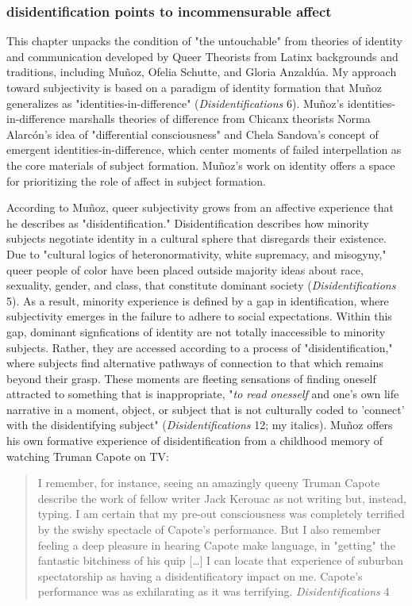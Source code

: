 \documentclass[11pt]{article}
\begin{document}
\subsubsection{disidentification points to incommensurable affect}
\label{sec:org0570c01}
This chapter unpacks the condition of "the untouchable" from theories
of identity and communication developed by Queer Theorists from Latinx
backgrounds and traditions, including Muñoz, Ofelia Schutte, and
Gloria Anzaldúa. My approach toward subjectivity is based on a
paradigm of identity formation that Muñoz generalizes as
"identities-in-difference" (\emph{Disidentifications} 6). Muñoz's
identities-in-difference marshalls theories of difference from Chicanx
theorists Norma Alarcón's idea of "differential consciousness" and
Chela Sandova's concept of emergent identities-in-difference, which
center moments of failed interpellation as the core materials of
subject formation. Muñoz's work on identity offers a space for
prioritizing the role of affect in subject formation.

According to Muñoz, queer subjectivity grows from an affective
experience that he describes as "disidentification." Disidentification
describes how minority subjects negotiate identity in a cultural
sphere that disregards their existence. Due to "cultural logics of
heteronormativity, white supremacy, and misogyny," queer people of
color have been placed outside majority ideas about race, sexuality,
gender, and class, that constitute dominant society
(\emph{Disidentifications} 5). As a result, minority experience is defined
by a gap in identification, where subjectivity emerges in the failure
to adhere to social expectations. Within this gap, dominant
signfications of identity are not totally inaccessible to minority
subjects. Rather, they are accessed according to a process of
"disidentification," where subjects find alternative pathways of
connection to that which remains beyond their grasp. These moments are
fleeting sensations of finding oneself attracted to something that is
inappropriate, "\emph{to read onesself} and one's own life narrative in a
moment, object, or subject that is not culturally coded to 'connect'
with the disidentifying subject" (\emph{Disidentifications} 12; my
italics). Muñoz offers his own formative experience of
disidentification from a childhood memory of watching Truman Capote on
TV:

\begin{quote}
I remember, for instance, seeing an amazingly queeny Truman Capote
describe the work of fellow writer Jack Kerouac as not writing but,
instead, typing. I am certain that my pre-out consciousness was
completely terrified by the swishy spectacle of Capote's
performance. But I also remember feeling a deep pleasure in hearing
Capote make language, in "getting" the fantastic bitchiness of his
quip [\ldots{}] I can locate that experience of suburban spectatorship as
having a disidentificatory impact on me. Capote's performance was as
exhilarating as it was terrifying. \emph{Disidentifications} 4
\end{quote}
\end{document}
